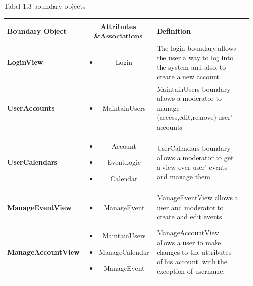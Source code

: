 \documentclass{article}
\begin{document}
		\pagebreak{}
\hfill \break Tabel 1.3 boundary objects\\
\begin{tabular}{l c l @{} l}
	\multicolumn{2}{c}{} \\
	\textbf{Boundary Object}&\textbf{Attributes \&Associations}&\textbf{Definition}\\
	\hline
	\textbf{LoginView}&\parbox{.45\textwidth}{
            \begin{itemize}
                \item Login
            \end{itemize} }
&\parbox{.3\textwidth}{
            The login boundary allows the user a way to log into the system and also, to create a new account. } \\
	\hline
	\textbf{UserAccounts}&\parbox{.45\textwidth}{
            \begin{itemize}
                \item MaintainUsers
            \end{itemize} }
&\parbox{.3\textwidth}{
            MaintainUsers boundary allows a moderator to manage (access,edit,remove) user' accounts } \\
	\hline
	\textbf{UserCalendars}&\parbox{.45\textwidth}{
            \begin{itemize}
                \item Account
                \item EventLogic
                \item Calendar
            \end{itemize} }
&\parbox{.3\textwidth}{
           UserCalendars  boundary allows a moderator to get a view over user' events and manage them. } \\
	\hline
	\textbf{ManageEventView}&\parbox{.45\textwidth}{
            \begin{itemize}
                \item ManageEvent
            \end{itemize} }
&\parbox{.3\textwidth}{
            ManageEventView allows a user and moderator to create and edit events.  } \\
	\hline
\textbf{ManageAccountView}&\parbox{.45\textwidth}{
            \begin{itemize}
                \item MaintainUsers
                \item ManageCalendar
                \item ManageEvent
            \end{itemize} }
&\parbox{.3\textwidth}{
            ManageAccountView allows a user to make changes to the attributes of his account, with the exception of username.  } \\
	\hline


\end{tabular}
\end{document}
